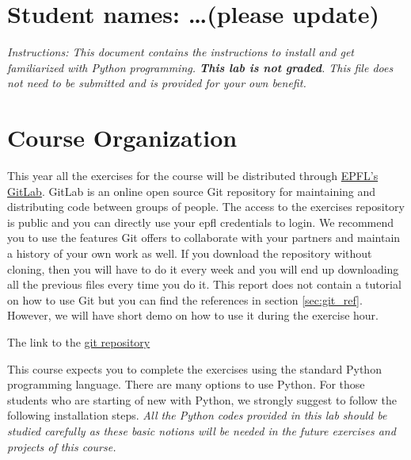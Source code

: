 \documentclass{cmc}
\begin{document}
\maketitle
\pagestyle{fancy}
\tableofcontents
{} 

\newpage
\section*{Student names: \ldots (please update)}

\textit{Instructions: This document contains the instructions to
  install and get familiarized with Python programming.  \textbf{This
    lab is not graded}. This file does not need to be submitted and is
  provided for your own benefit.}


\section{Course Organization}

This year all the exercises for the course will be distributed through
\href{https://gitlab.epfl.ch/}{EPFL's GitLab}.  GitLab is an online
open source Git repository for maintaining and distributing code
between groups of people. The access to the exercises repository is
public and you can directly use your epfl credentials to login.  We
recommend you to use the features Git offers to collaborate with your
partners and maintain a history of your own work as well.  If you
download the repository without cloning, then you will have to do it
every week and you will end up downloading all the previous files
every time you do it. This report does not contain a tutorial on how
to use Git but you can find the references in section
\ref{sec:git_ref}. However, we will have short demo on how to use it
during the exercise hour.

The link to the \href{https://gitlab.epfl.ch/BioRobCMC/2019}{git
  repository}

This course expects you to complete the exercises using the standard
Python programming language. There are many options to use Python. For
those students who are starting of new with Python, we strongly
suggest to follow the following installation steps.
\textbf{}\textit{All the Python codes provided in this
  lab should be studied carefully as these basic notions will be
  needed in the future exercises and projects of this course.}
\end{document}
